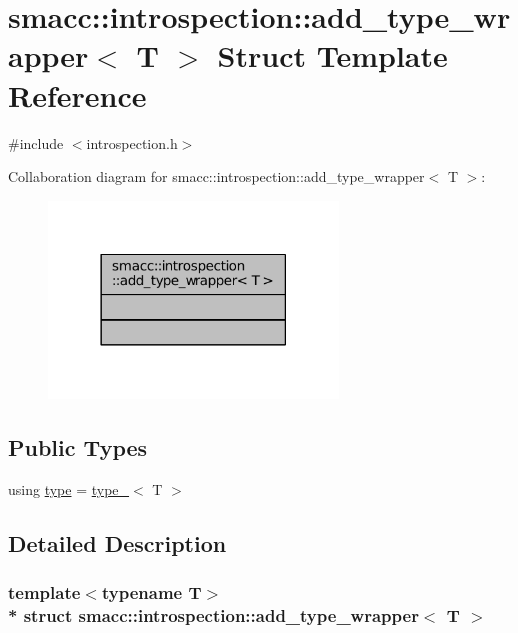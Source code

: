 \hypertarget{structsmacc_1_1introspection_1_1add__type__wrapper}{}\section{smacc\+:\+:introspection\+:\+:add\+\_\+type\+\_\+wrapper$<$ T $>$ Struct Template Reference}
\label{structsmacc_1_1introspection_1_1add__type__wrapper}


{\ttfamily \#include $<$introspection.\+h$>$}



Collaboration diagram for smacc\+:\+:introspection\+:\+:add\+\_\+type\+\_\+wrapper$<$ T $>$\+:
\nopagebreak
\begin{figure}[H]
\begin{center}
\leavevmode
\includegraphics[width=218pt]{structsmacc_1_1introspection_1_1add__type__wrapper__coll__graph}
\end{center}
\end{figure}
\subsection*{Public Types}
\begin{DoxyCompactItemize}
\item 
using \hyperlink{structsmacc_1_1introspection_1_1add__type__wrapper_a4390a0426686e1e115d4c3ad22165cd9}{type} = \hyperlink{structsmacc_1_1introspection_1_1type__}{type\+\_\+}$<$ T $>$
\end{DoxyCompactItemize}


\subsection{Detailed Description}
\subsubsection*{template$<$typename T$>$\\*
struct smacc\+::introspection\+::add\+\_\+type\+\_\+wrapper$<$ T $>$}



